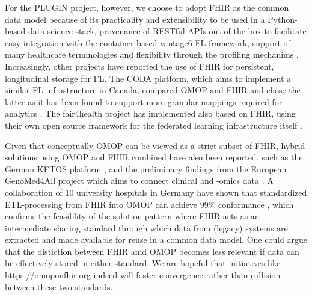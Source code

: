 \documentclass[
  authoryear]{elsarticle}
\begin{document}
For the PLUGIN project, however, we choose to adopt FHIR as the common
data model because of its practicality and extensibility to be used in a
Python-based data science stack, provenance of RESTful APIs
out-of-the-box to facilitate easy integration with the container-based
vantage6 FL framework, support of many healthcare terminologies and
flexibility through the profiling mechanims
\citep{choudhury2020personal, smits2022improved}. Increasingly, other
projects have reported the use of FHIR for persistent, longitudinal
storage for FL. The CODA platform, which aims to implement a similar FL
infrastructure in Canada, compared OMOP and FHIR and chose the latter as
it has been found to support more granular mappings required for
analytics \citep{mullie2023coda}. The fair4health project has
implemented also based on FHIR, using their own open source framework
for the federated learning infrastructure itself
\citep{sinaci2024privacypreserving}.

Given that conceptually OMOP can be viewed as a strict subset of FHIR,
hybrid solutions using OMOP and FHIR combined have also been reported,
such as the German KETOS platform \citep{gruendner2019ketos}, and the
preliminary findings from the European GenoMed4All project which aims to
connect clinical and -omics data \citep{cremonesi2023need}. A
collaboration of 10 university hospitals in Germany have shown that
standardized ETL-processing from FHIR into OMOP can achieve 99\%
conformance \citep{peng2023etlprocess}, which confirms the feasiblity of
the solution pattern where FHIR acts as an intermediate sharing standard
through which data from (legacy) systems are extracted and made
available for reuse in a common data model. One could argue that the
distiction between FHIR amd OMOP becomes less relevant if data can be
effectively stored in either standard. We are hopeful that initiatives
like https://omoponfhir.org indeed will foster convergence rather than
collision between these two standards.
\end{document}
